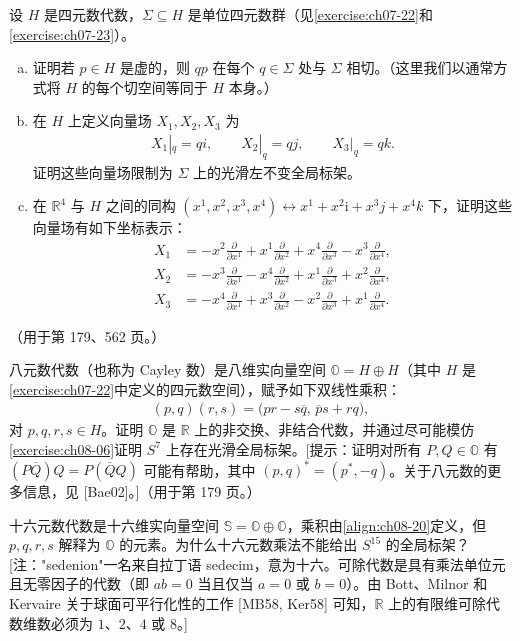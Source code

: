 \documentclass[../../main.tex]{subfiles}
\begin{document}
\begin{exercise}\label{exercise:ch08-06}
设 $H$ 是四元数代数，$\Sigma\subseteq H$ 是单位四元数群（见\cref{exercise:ch07-22}和\cref{exercise:ch07-23}）。
\begin{enumerate}[(a)]
\item 证明若 $p\in H$ 是虚的，则 $qp$ 在每个 $q\in\Sigma$ 处与 $\Sigma$ 相切。（这里我们以通常方式将 $H$ 的每个切空间等同于 $H$ 本身。）

\item 在 $H$ 上定义向量场 $X_1,X_2,X_3$ 为
\begin{align*}
X_1|_q=qi,\qquad X_2|_q=qj,\qquad X_3|_q=qk.
\end{align*}
证明这些向量场限制为 $\Sigma$ 上的光滑左不变全局标架。

\item 在 $\mathbb{R}^4$ 与 $H$ 之间的同构 $(x^1,x^2,x^3,x^4)\leftrightarrow x^1+x^2\mathrm{i}+x^3j+x^4k$ 下，证明这些向量场有如下坐标表示：
\begin{align*}
X_1&=-x^2\frac{\partial}{\partial x^1}+x^1\frac{\partial}{\partial x^2}+x^4\frac{\partial}{\partial x^3}-x^3\frac{\partial}{\partial x^4},\\
X_2&=-x^3\frac{\partial}{\partial x^1}-x^4\frac{\partial}{\partial x^2}+x^1\frac{\partial}{\partial x^3}+x^2\frac{\partial}{\partial x^4},\\
X_3&=-x^4\frac{\partial}{\partial x^1}+x^3\frac{\partial}{\partial x^2}-x^2\frac{\partial}{\partial x^3}+x^1\frac{\partial}{\partial x^4}.
\end{align*}
\end{enumerate}
（用于第 179、562 页。）
\end{exercise}

\begin{exercise}\label{exercise:ch08-07}
八元数代数（也称为 Cayley 数）是八维实向量空间 $\mathbb{O}=H\oplus H$（其中 $H$ 是\cref{exercise:ch07-22}中定义的四元数空间），赋予如下双线性乘积：
\begin{align}
(p,q)(r,s)=\bigl(pr-s\overline{q},\,\overline{p}s+rq\bigr),\label{align:ch08-20}
\end{align}
对 $p,q,r,s\in H$。证明 $\mathbb{O}$ 是 $\mathbb{R}$ 上的非交换、非结合代数，并通过尽可能模仿\cref{exercise:ch08-06}证明 $S^7$ 上存在光滑全局标架。[提示：证明对所有 $P,Q\in\mathbb{O}$ 有 $(P\overline{Q})Q=P(\overline{Q}Q)$ 可能有帮助，其中 $(p,q)^*=(p^*,-q)$。关于八元数的更多信息，见 [Bae02]。]（用于第 179 页。）
\end{exercise}

\begin{exercise}\label{exercise:ch08-08}
十六元数代数是十六维实向量空间 $\mathbb{S}=\mathbb{O}\oplus\mathbb{O}$，乘积由\eqref{align:ch08-20}定义，但 $p,q,r,s$ 解释为 $\mathbb{O}$ 的元素。为什么十六元数乘法不能给出 $S^{15}$ 的全局标架？[注："sedenion"一名来自拉丁语 sedecim，意为十六。可除代数是具有乘法单位元且无零因子的代数（即 $ab=0$ 当且仅当 $a=0$ 或 $b=0$）。由 Bott、Milnor 和 Kervaire 关于球面可平行化性的工作 [MB58, Ker58] 可知，$\mathbb{R}$ 上的有限维可除代数维数必须为 $1$、$2$、$4$ 或 $8$。]
\end{exercise}
\end{document}
